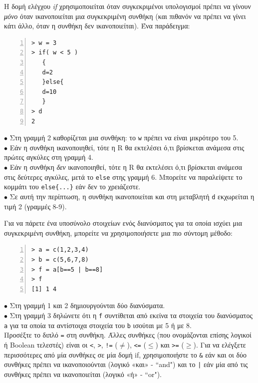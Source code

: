 \documentclass[a4paper,10pt,twocolumn]{article}
\begin{document}
Η δομή ελέγχου \emph{if} χρησιμοποιείται όταν συγκεκριμένοι υπολογισμοί πρέπει να γίνουν \emph{μόνο} όταν
ικανοποιείται μια συγκεκριμένη συνθήκη (και πιθανόν να πρέπει να γίνει κάτι άλλο, όταν η συνθήκη δεν
ικανοποιείται). Ένα παράδειγμα:

\begin{Verbatim}[frame=single,numbers=left,gobble=0, xleftmargin=0.35cm, numbersep=0.1cm]
> w = 3
> if( w < 5 )
   {
   d=2
   }else{
   d=10
   }
> d
2
\end{Verbatim}

\noindent $\bullet$ Στη γραμμή 2 καθορίζεται μια συνθήκη: το \texttt{w} πρέπει να είναι μικρότερο του 5.\\
\noindent $\bullet$ Εάν η συνθήκη ικανοποιηθεί, τότε η R θα εκτελέσει ό,τι βρίσκεται ανάμεσα στις πρώτες αγκύλες
στη γραμμή 4.\\
\noindent $\bullet$ Εάν η συνθήκη \emph{δεν} ικανοποιηθεί, τότε η R θα εκτελέσει ό,τι βρίσκεται ανάμεσα στις
δεύτερες αγκύλες, μετά το \texttt{else} στης γραμμή 6. Μπορείτε να παραλείψετε το κομμάτι του \verb!else{...}!
εάν δεν το χρειάζεστε.\\
\noindent $\bullet$ Σε αυτή την περίπτωση, η συνθήκη ικανοποιείται και στη μεταβλητή \texttt{d} εκχωρείται
η τιμή 2 (γραμμές 8-9).

Για να πάρετε ένα υποσύνολο στοιχείων ενός διανύσματος για τα οποία ισχύει μια συγκεκριμένη συνθήκη, μπορείτε 
να χρησιμοποιήσετε μια πιο σύντομη μέθοδο:

\begin{Verbatim}[frame=single,numbers=left,gobble=0, xleftmargin=0.35cm, numbersep=0.1cm]
> a = c(1,2,3,4)
> b = c(5,6,7,8)
> f = a[b==5 | b==8]
> f
[1] 1 4
\end{Verbatim}

\noindent $\bullet$ Στη γραμμή 1 και 2 δημιουργούνται δύο διανύσματα.\\
\noindent $\bullet$ Στη γραμμή 3 δηλώνετε ότι η \texttt{f} συντίθεται από εκείνα τα στοιχεία του διανύσματος
\texttt{a} για τα οποία τα αντίστοιχα στοιχεία του \texttt{b} ισούται με 5 ή με 8. \\

Προσέξτε το διπλό \texttt{=} στη συνθήκη. Άλλες συνθήκες (που ονομάζονται επίσης λογικοί ή Boolean τελεστές)
είναι οι \texttt{<}, \texttt{>}, \texttt{!=} ($\neq$), \texttt{<=} ($\leq$) και \texttt{>=} ($\geq$). Για να
ελέγξετε περισσότερες από μία συνθήκες σε μία δομή if, χρησιμοποιήστε το \texttt{\&} εάν και οι δύο 
συνθήκες πρέπει να ικανοποιούνται (λογικό «και» - ``and") και το \texttt{|} εάν μία από τις συνθήκες πρέπει να 
ικανοποιείται (λογικό «ή» - ``or").
\end{document}
